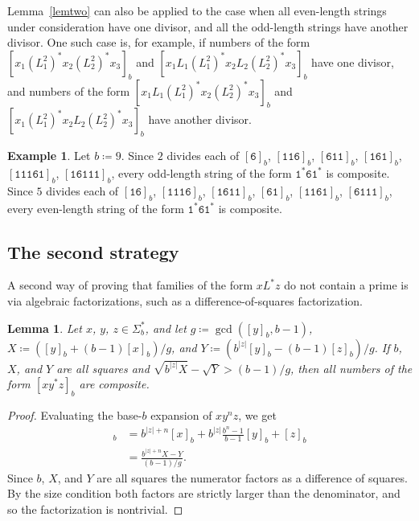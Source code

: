 \documentclass[12pt]{article}
\theoremstyle{plain}
\newtheorem{lemma}[theorem]{Lemma}
\theoremstyle{definition}
\newtheorem{example}[theorem]{Example}
\newcommand{\0}{\mathtt{0}}
\newcommand{\1}{\mathtt{1}}
\newcommand{\2}{\mathtt{2}}
\newcommand{\3}{\mathtt{3}}
\newcommand{\4}{\mathtt{4}}
\newcommand{\5}{\mathtt{5}}
\newcommand{\6}{\mathtt{6}}
\newcommand{\7}{\mathtt{7}}
\newcommand{\8}{\mathtt{8}}
\newcommand{\9}{\mathtt{9}}
\begin{document}
Lemma~\ref{lemtwo} can also be applied to the case when all even-length 
strings under consideration have one divisor, and all the odd-length 
strings have another divisor.  One such case is, for example,
if numbers of the form 
$[x_1(L_1^2)^*x_2(L_2^2)^*x_3]_b$ and $[x_1 L_1(L_1^2)^*x_2L_2(L_2^2)^*x_3]_b$ 
have one divisor, and numbers of the form $[x_1L_1(L_1^2)^*x_2(L_2^2)^*x_3]_b$ 
and $[x_1(L_1^2)^*x_2L_2(L_2^2)^*x_3]_b$ have another divisor.
\begin{example}
Let $b \coloneqq 9$.
Since $2$ divides each of $[\6]_b$,
$[\1\1\6]_b$,
$[\6\1\1]_b$,
$[\1\6\1]_b$,
$[\1\1\1\6\1]_b$, 
$[\1\6\1\1\1]_b$, every odd-length string of the form $\1^*\6\1^*$ is 
composite.
Since $5$ divides each of $[\1\6]_b$,
$[\1\1\1\6]_b$,
$[\1\6\1\1]_b$,
$[\6\1]_b$,
$[\1\1\6\1]_b$, 
$[\6\1\1\1]_b$,
every even-length string of the form $\1^*\6\1^*$ is composite.
\end{example}

\subsection{The second strategy}

A second way of proving that families of the form $xL^*z$ do not contain a 
prime is via algebraic factorizations, such as a difference-of-squares 
factorization.

\begin{lemma}\label{lemsquares}
Let $x$, $y$, $z\in\Sigma^*_b$, and let $g\coloneqq\gcd([y]_b,b-1)$, 
$X\coloneqq([y]_b+(b-1)[x]_b)/g$, and $Y\coloneqq(b^{\lvert{z}\rvert}[y]_b-(b-1)[z]_b)/g$.
If\/ $b$, $X$, and $Y$ are all squares and 
$\sqrt{b^{\lvert z\rvert}X}-\sqrt{Y}>(b-1)/g$, then all numbers of the form
 $[xy^*z]_b$ are composite.
\end{lemma}
\begin{proof}
Evaluating the base-$b$ expansion of $xy^nz$, we get
\begin{align*}
[xy^nz]_b &= b^{\lvert z\rvert+n}[x]_b + b^{\lvert z\rvert}\frac{b^n-1}{b-1}[y]_b + [z]_b \\
&= \frac{b^{\lvert z\rvert+n}X-Y}{(b-1)/g} . 
\end{align*}
Since $b$, $X$, and $Y$ are all squares the numerator factors as a 
difference of squares.  By the size condition both factors are 
strictly larger than the
denominator, and so the factorization is nontrivial.
\end{proof}
\end{document}
